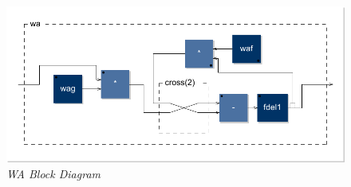 \documentclass[twoside,a4paper]{article}
\begin{document}
\begin{figure}[ht]
\centerline{\includegraphics[width=.45\textwidth]{img/wa}}
\caption{\label{wa-block}{\it WA Block Diagram}}
\end{figure}


\end{document}
